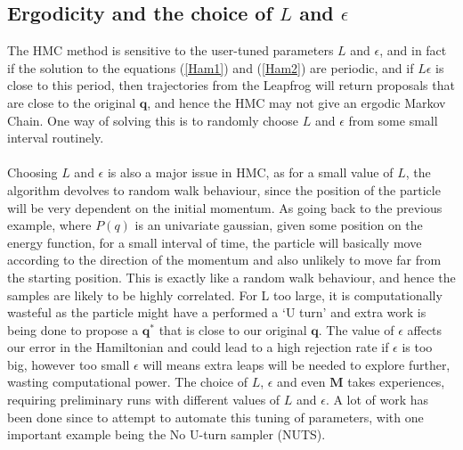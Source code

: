 \documentclass[11pt]{article}
\begin{document}
\subsection{Ergodicity and the choice of $L$ and $\epsilon$}
The HMC method is sensitive to the user-tuned parameters $L$ and $\epsilon$, and in fact if the solution to the equations (\ref{Ham1}) and (\ref{Ham2}) are periodic, and if $L\epsilon$ is close to this period, then trajectories from the Leapfrog will return proposals that are close to the original $\mathbf{q}$, and hence the HMC may not give an ergodic Markov Chain. One way of solving this is to randomly choose $L$ and $\epsilon$ from some small interval routinely. 
\\
\\
Choosing $L$ and $\epsilon$ is also a major issue in HMC, as for a small value of $L$, the algorithm devolves to random walk behaviour, since the position of the particle will be very dependent on the initial momentum. As going back to the previous example, where $P(q)$ is an univariate gaussian, given some position on the energy function, for a small interval of time, the particle will basically move according to the direction of the momentum and also unlikely to move far from the starting position. This is exactly like  a random walk behaviour, and hence the samples are likely to be highly correlated. For L too large, it is computationally wasteful as the particle might have a performed a `U turn' and extra work is being done to propose a $\mathbf{q^{*}}$ that is close to our original $\mathbf{q}$. The value of $\epsilon$ affects our error in the Hamiltonian and could lead to a high rejection rate if $\epsilon$ is too big, however too small $\epsilon$ will means extra leaps will be needed to explore further, wasting computational power. The choice of $L$, $\epsilon$ and even $\mathbf{M}$ takes experiences, requiring preliminary runs with different values of $L$ and $\epsilon$. A lot of work has been done since to attempt to automate this tuning of parameters, with one important example being the No U-turn sampler (NUTS).
\end{document}
